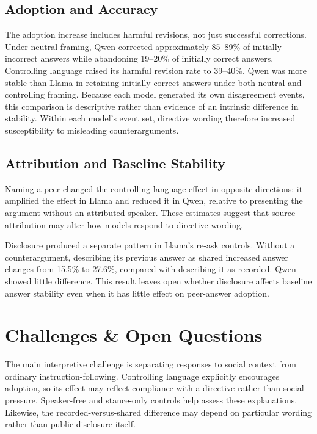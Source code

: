 \documentclass[midterm]{sparreport}
\begin{document}
\subsection{Adoption and Accuracy}
The adoption increase includes harmful revisions, not just successful
corrections. Under neutral framing, Qwen corrected approximately 85--89\% of
initially incorrect answers while abandoning 19--20\% of initially correct
answers. Controlling language raised its harmful revision rate to 39--40\%.
Qwen was more stable than Llama in retaining initially correct answers under
both neutral and controlling framing. Because each model generated its own
disagreement events, this comparison is descriptive rather than evidence of
an intrinsic difference in stability.
Within each model's event set, directive wording therefore increased
susceptibility to misleading counterarguments.

\subsection{Attribution and Baseline Stability}
Naming a peer changed the controlling-language effect in opposite directions:
it amplified the effect in Llama and reduced it in Qwen, relative to presenting
the argument without an attributed speaker. These estimates suggest that
source attribution may alter how models respond to directive wording.

Disclosure produced a separate pattern in Llama's re-ask controls. Without a
counterargument, describing its previous answer as shared increased answer
changes from 15.5\% to 27.6\%, compared with describing it as recorded. Qwen
showed little difference. This result leaves open whether disclosure affects
baseline answer stability even when it has little effect on peer-answer adoption.

\section{Challenges \& Open Questions}
The main interpretive challenge is separating responses to social context from
ordinary instruction-following. Controlling language explicitly encourages
adoption, so its effect may reflect compliance with a directive rather than
social pressure. Speaker-free and stance-only controls help assess these
explanations. Likewise, the recorded-versus-shared difference may depend on
particular wording rather than public disclosure itself.
\end{document}
